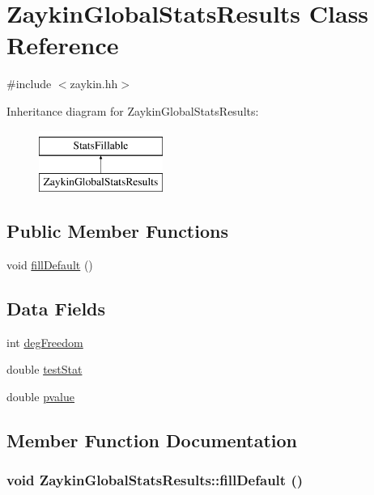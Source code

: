 \hypertarget{classZaykinGlobalStatsResults}{
\section{ZaykinGlobalStatsResults Class Reference}
\label{classZaykinGlobalStatsResults}
}


{\ttfamily \#include $<$zaykin.hh$>$}

Inheritance diagram for ZaykinGlobalStatsResults:\begin{figure}[H]
\begin{center}
\leavevmode
\includegraphics[height=2cm]{classZaykinGlobalStatsResults}
\end{center}
\end{figure}
\subsection*{Public Member Functions}
\begin{DoxyCompactItemize}
\item 
void \hyperlink{classZaykinGlobalStatsResults_a6b45b4b6ad25c29a63363651345f0dbe}{fillDefault} ()
\end{DoxyCompactItemize}
\subsection*{Data Fields}
\begin{DoxyCompactItemize}
\item 
int \hyperlink{classZaykinGlobalStatsResults_a4a9280a8dc6ea691eaadca1ae5438663}{degFreedom}
\item 
double \hyperlink{classZaykinGlobalStatsResults_aaedd2cf27b9e362ff177dd01a2809192}{testStat}
\item 
double \hyperlink{classZaykinGlobalStatsResults_ab8725b9e186651f5d41be92b4947152b}{pvalue}
\end{DoxyCompactItemize}


\subsection{Member Function Documentation}
\hypertarget{classZaykinGlobalStatsResults_a6b45b4b6ad25c29a63363651345f0dbe}{
\subsubsection[{fillDefault}]{\setlength{\rightskip}{0pt plus 5cm}void ZaykinGlobalStatsResults::fillDefault ()}}
\label{classZaykinGlobalStatsResults_a6b45b4b6ad25c29a63363651345f0dbe}


